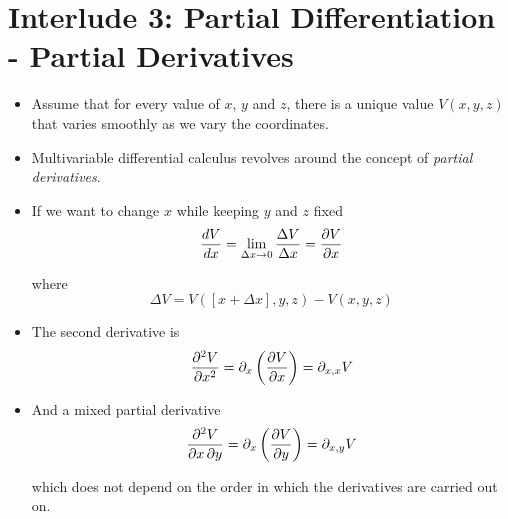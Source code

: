 \documentclass[../main.tex]{subfiles}
\begin{document}
\section{Interlude 3: Partial Differentiation - Partial Derivatives}
\begin{itemize}
    \item Assume that for every value of $x$, $y$ and $z$, there is a unique
        value $V(x,y,z)$ that varies smoothly as we vary the coordinates.

    \item Multivariable differential calculus revolves around the concept of
        \textit{partial derivatives}.

    \item If we want to change $x$ while keeping $y$ and $z$ fixed
        \begin{equation}
            \frac{dV}{dx} = \lim_{\Delta x \rightarrow 0} \frac{\Delta V}{\Delta x} = \pdv{V}{x}
        \end{equation}

        where
        \begin{equation}
            \Delta V = V (\left[x + \Delta x\right], y, z) - V(x, y, z)
        \end{equation}

    \item The second derivative is 
        \begin{equation}
            \pdv[order=2]{V}{x} = \partial_x \left(\pdv{V}{x}\right) = \partial_{x,x}V
        \end{equation}

    \item And a mixed partial derivative
        \begin{equation}
            \pdv{V}{x,y} = \partial_x \left(\pdv{V}{y}\right) = \partial_{x,y}V
        \end{equation}

        which does not depend on the order in which the derivatives are carried
        out on.

\end{itemize}
\end{document}
